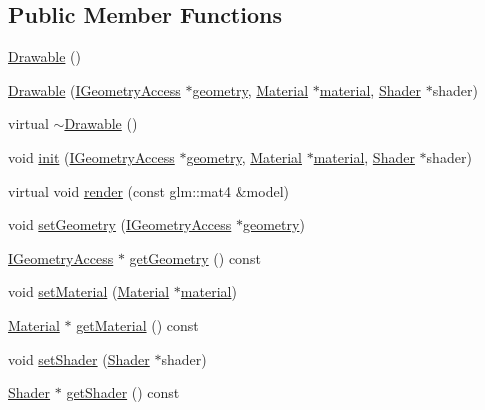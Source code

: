 \subsection*{Public Member Functions}
\begin{DoxyCompactItemize}
\item 
\mbox{\hyperlink{classec_1_1_drawable_adb3c4e7b4d3d510489a26b3d1a8094a2}{Drawable}} ()
\item 
\mbox{\hyperlink{classec_1_1_drawable_a1a6fee8a6543e001ee2943bda72e17cd}{Drawable}} (\mbox{\hyperlink{classec_1_1_i_geometry_access}{I\+Geometry\+Access}} $\ast$\mbox{\hyperlink{_resource_type_8h_af12fe3e5d8da3d7bd4c76e44cca2319c}{geometry}}, \mbox{\hyperlink{classec_1_1_material}{Material}} $\ast$\mbox{\hyperlink{_resource_type_8h_a16f6cac2c88eef38bdba4f004e042542}{material}}, \mbox{\hyperlink{classec_1_1_shader}{Shader}} $\ast$shader)
\item 
virtual \mbox{\hyperlink{classec_1_1_drawable_a4a82e5cd6d6a47ad86ed42cfdda512d8}{$\sim$\+Drawable}} ()
\item 
void \mbox{\hyperlink{classec_1_1_drawable_ac494c72b1b0396dbe25a822da4e328a9}{init}} (\mbox{\hyperlink{classec_1_1_i_geometry_access}{I\+Geometry\+Access}} $\ast$\mbox{\hyperlink{_resource_type_8h_af12fe3e5d8da3d7bd4c76e44cca2319c}{geometry}}, \mbox{\hyperlink{classec_1_1_material}{Material}} $\ast$\mbox{\hyperlink{_resource_type_8h_a16f6cac2c88eef38bdba4f004e042542}{material}}, \mbox{\hyperlink{classec_1_1_shader}{Shader}} $\ast$shader)
\item 
virtual void \mbox{\hyperlink{classec_1_1_drawable_ac9d3345bd308fce8c99adbfc12c53106}{render}} (const glm\+::mat4 \&model)
\item 
void \mbox{\hyperlink{classec_1_1_drawable_a76bcb843ef5ced898724fa79a9b20250}{set\+Geometry}} (\mbox{\hyperlink{classec_1_1_i_geometry_access}{I\+Geometry\+Access}} $\ast$\mbox{\hyperlink{_resource_type_8h_af12fe3e5d8da3d7bd4c76e44cca2319c}{geometry}})
\item 
\mbox{\hyperlink{classec_1_1_i_geometry_access}{I\+Geometry\+Access}} $\ast$ \mbox{\hyperlink{classec_1_1_drawable_a49a90aac40736ff3c182196c2b86c2f3}{get\+Geometry}} () const
\item 
void \mbox{\hyperlink{classec_1_1_drawable_a0fc7868639a83830d4b60dfad85a0826}{set\+Material}} (\mbox{\hyperlink{classec_1_1_material}{Material}} $\ast$\mbox{\hyperlink{_resource_type_8h_a16f6cac2c88eef38bdba4f004e042542}{material}})
\item 
\mbox{\hyperlink{classec_1_1_material}{Material}} $\ast$ \mbox{\hyperlink{classec_1_1_drawable_ac74210aca5428bedbf8af7abe9adbcc1}{get\+Material}} () const
\item 
void \mbox{\hyperlink{classec_1_1_drawable_a413f373bb2cba109497377e18b084048}{set\+Shader}} (\mbox{\hyperlink{classec_1_1_shader}{Shader}} $\ast$shader)
\item 
\mbox{\hyperlink{classec_1_1_shader}{Shader}} $\ast$ \mbox{\hyperlink{classec_1_1_drawable_a7de4c8aa937bda1009c6428ceeb541c1}{get\+Shader}} () const
\end{DoxyCompactItemize}
